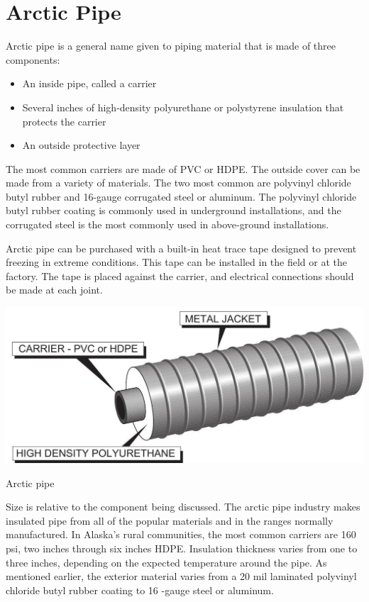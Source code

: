 \documentclass[10pt]{article}
\begin{document}
\section{Arctic Pipe}
Arctic pipe is a general name given to piping material that is made of three components:

\begin{itemize}
  \item An inside pipe, called a carrier

  \item Several inches of high-density polyurethane or polystyrene insulation that protects the carrier

  \item An outside protective layer

\end{itemize}
The most common carriers are made of PVC or HDPE. The outside cover can be made from a variety of materials. The two most common are polyvinyl chloride butyl rubber and 16-gauge corrugated steel or aluminum. The polyvinyl chloride butyl rubber coating is commonly used in underground installations, and the corrugated steel is the most commonly used in above-ground installations.

Arctic pipe can be purchased with a built-in heat trace tape designed to prevent freezing in extreme conditions. This tape can be installed in the field or at the factory. The tape is placed against the carrier, and electrical connections should be made at each joint.

\includegraphics[max width=\textwidth]{2022_11_03_fc0cbc2f3612fab6edd2g-33}

Arctic pipe

Size is relative to the component being discussed. The arctic pipe industry makes insulated pipe from all of the popular materials and in the ranges normally manufactured. In Alaska's rural communities, the most common carriers are 160 psi, two inches through six inches HDPE. Insulation thickness varies from one to three inches, depending on the expected temperature around the pipe. As mentioned earlier, the exterior material varies from a 20 mil laminated polyvinyl chloride butyl rubber coating to 16 -gauge steel or aluminum.
\end{document}
